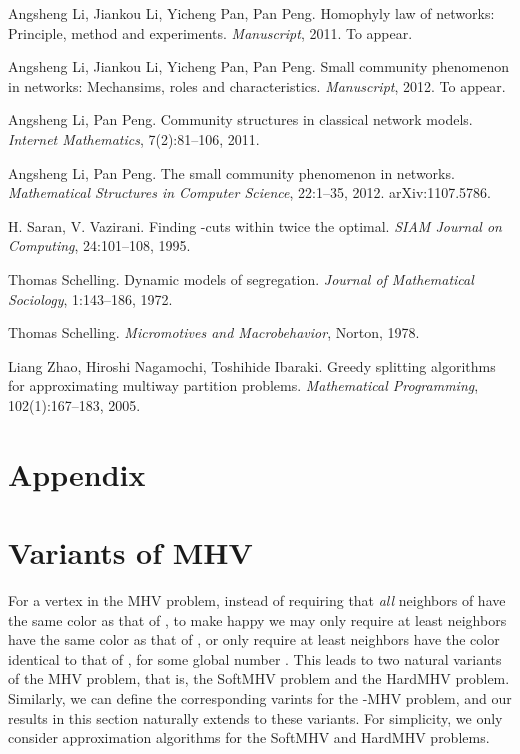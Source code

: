 \documentclass[11pt]{article}
\begin{document}
\begin{thebibliography}{99}
Angsheng Li, Jiankou Li, Yicheng Pan, Pan Peng.
Homophyly law of networks: Principle, method and experiments.
{\em Manuscript}, 2011. To appear.

Angsheng Li, Jiankou Li, Yicheng Pan, Pan Peng.
Small community phenomenon in networks: Mechansims, roles and characteristics.
{\em Manuscript}, 2012. To appear.

Angsheng Li, Pan Peng.
Community structures in classical network models.
{\em Internet Mathematics}, 7(2):81--106, 2011.

Angsheng Li, Pan Peng.
The small community phenomenon in networks.
{\em Mathematical Structures in Computer Science},
22:1--35, 2012.
arXiv:1107.5786.

H. Saran, V. Vazirani.
Finding -cuts within twice the optimal.
{\em SIAM Journal on Computing}, 24:101--108, 1995.

Thomas Schelling.
Dynamic models of segregation.
{\em Journal of Mathematical Sociology}, 1:143--186, 1972.

Thomas Schelling.
{\em Micromotives and Macrobehavior}, Norton, 1978.

Liang Zhao, Hiroshi Nagamochi, Toshihide Ibaraki.
Greedy splitting algorithms for approximating multiway partition problems.
{\em Mathematical Programming}, 102(1):167--183, 2005.
\end{thebibliography}




\appendix

\section*{Appendix}




\section{Variants of MHV}
\label{sec - variants of MHV}
For a vertex  in the MHV problem, instead of requiring that {\em all}
neighbors of  have the same color as that of , to make  happy
we may only require at least  neighbors have the same
color as that of , or only require at least  neighbors have the color
identical to that of , for some global number . This leads to two
natural variants of the MHV problem, that is, the SoftMHV problem and
the HardMHV problem. Similarly, we can define the corresponding varints
for the -MHV problem, and our results in this section naturally extends
to these variants. For simplicity, we only consider approximation algorithms
for the SoftMHV and HardMHV problems.
\end{document}
